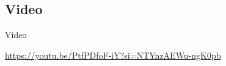 \documentclass[
	11pt, %
]{beamer}
\begin{document}
\subsection{Video}
\begin{frame}{Video}

\url{https://youtu.be/PtfPDfoF-iY?si=NTYnzAEWu-ngK0pb}
    
\end{frame}
\end{document}
